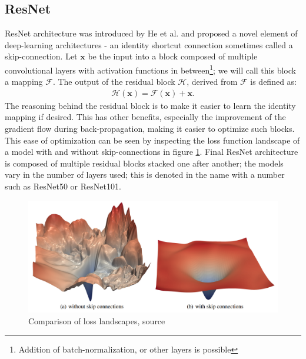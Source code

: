\subsection{ResNet}
ResNet architecture was introduced by He et al. \cite{He2015} and proposed a novel element of deep-learning architectures - an identity shortcut connection sometimes called a skip-connection. Let $\mathbf{x}$ be the input into a block composed of multiple convolutional layers with activation functions in between\footnote{Addition of batch-normalization, or other layers is possible}; we will call this block a mapping $\mathcal{F}$. The output of the residual block $\mathcal{H}$, derived from $\mathcal{F}$ is defined as:
\begin{align}
    \mathcal{H}\left(\mathbf{x}\right) = \mathcal{F} \left(\mathbf{x}\right) + \mathbf{x}.
\end{align}
The reasoning behind the residual block is to make it easier to learn the identity mapping if desired. This has other benefits, especially the improvement of the gradient flow during back-propagation, making it easier to optimize such blocks. This ease of optimization can be seen by inspecting the loss function landscape of a model with and without skip-connections in figure \ref{fig:resnet_loss}.
Final ResNet architecture is composed of multiple residual blocks stacked one after another; the models vary in the number of layers used; this is denoted in the name with a number such as ResNet50 or ResNet101.

\begin{figure}
    \centering
    \includegraphics[width=\linewidth]{images/resnet_loss.png}
    \caption{Comparison of loss landscapes, source \cite{Li2017}}
    \label{fig:resnet_loss}
\end{figure}

